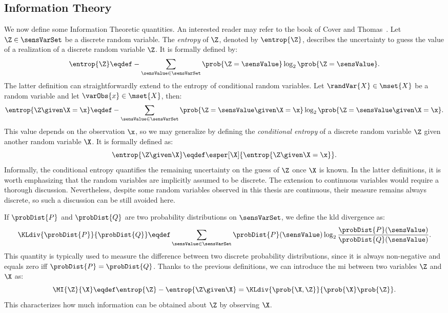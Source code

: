 \subsection{Information Theory}
We now define some Information Theoretic quantities.
An interested reader may refer to the book of Cover and Thomas~\cite{cover_elements_2006}.
Let \(\Z \in \sensVarSet\) be a discrete random variable. 
The \emph{entropy} of \(\Z\), denoted by \(\entrop{\Z}\), describes the uncertainty to guess the value of a realization of a discrete random variable \(\Z\). 
It is formally defined by:
\begin{equation}
	\entrop{\Z} \eqdef -\sum_{\sensValue \in \sensVarSet}
	\prob{\Z = \sensValue} \log_2\prob{\Z = \sensValue}.
\end{equation}
The latter definition can straightforwardly extend to the entropy of conditional random variables.
Let \(\randVar{X} \in \mset{X}\) be a random variable and let \(\varObs{x} \in \mset{X}\), then:
\begin{equation}
    \label{eq:def_cond_entrop_x}
	\entrop{\Z \given \X = \x} \eqdef -\sum_{\sensValue \in \sensVarSet}
	\prob{\Z = \sensValue \given \X = \x} \log_2\prob{\Z = \sensValue \given \X = \x}.
\end{equation}
This value depends on the observation \(\x\), so we may generalize by defining the \emph{conditional entropy} of a discrete random variable \(\Z\) given another random variable \(\X\). 
It is formally defined as:
\begin{equation}
	\entrop{\Z \given \X} \eqdef \esper[\X]{\entrop{\Z \given \X = \x}}.
    \label{eq:def_cond_entrop}
\end{equation}
Informally, the conditional entropy quantifies the remaining uncertainty on the guess of \(\Z\) once \(\X\) is known.
In the latter definitions, it is worth emphasizing that the random variables are implicitly assumed to be discrete.
The extension to continuous variables would require a thorough discussion.
Nevertheless, despite some random variables observed in this thesis are continuous, their measure remains always discrete, so such a discussion can be still avoided here.

If \(\probDist{P}\) and \(\probDist{Q}\) are two probability distributions on \(\sensVarSet\), we define the \gls{kld} divergence as:
\begin{equation}
	\KLdiv{\probDist{P}}{\probDist{Q}} \eqdef \sum_{\sensValue \in \sensVarSet}
	\probDist{P}(\sensValue) \log_2\frac{\probDist{P}(\sensValue)}{\probDist{Q}(\sensValue)}.
\end{equation}
This quantity is typically used to measure the difference between two discrete probability distributions, since it is always non-negative and equals zero \gls{iff} \(\probDist{P} = \probDist{Q}\).
Thanks to the previous definitions, we can introduce the \gls{mi} between two variables \(\Z\) and \(\X\) as:
\begin{equation}
    \MI{\Z}{\X} \eqdef \entrop{\Z} - \entrop{\Z \given \X} = 
    \KLdiv{\prob{\X, \Z}}{\prob{\X} \prob{\Z}}.
    \label{eq:def_MI}
\end{equation}
This characterizes how much information can be obtained about \(\Z\) by observing \(\X\).

